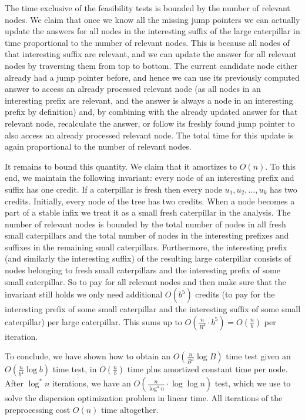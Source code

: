 \documentclass[a4paper,UKenglish]{lipics-v2016}
\theoremstyle{plain}
\begin{document}
The time exclusive of the feasibility tests is bounded by the number of relevant nodes.
We claim that once we know all the missing jump pointers we can actually update the answers
for all nodes in the interesting suffix of the large caterpillar in time proportional to the
number of relevant nodes. This is because all nodes of that interesting suffix are
relevant, and we can update the answer for all relevant nodes by traversing them from top
to bottom. The current candidate node either already had a jump pointer before, and hence
we can use its previously computed answer to access an already processed relevant node
(as all nodes in an interesting prefix are relevant, and the answer is always a node in an
interesting prefix by definition) and, by combining with the already updated answer for that
relevant node, recalculate the answer, or follow its freshly found jump pointer to also access
an already processed relevant node. The total time for this update is again proportional to the
number of relevant nodes. 

It remains to bound this quantity. We claim that it
amortizes to $O(n)$. To this end, we maintain the following invariant: every node
of an interesting prefix and suffix has one credit. If a caterpillar is fresh
then every node $u_{1},u_{2},\ldots,u_{k}$ has two credits. Initially, every node of the tree
has two credits. When a node becomes a part of a stable infix we treat it as a small fresh
caterpillar in the analysis. The number of relevant nodes is bounded by the total number
of nodes in all fresh small caterpillars and the total number of nodes in the interesting
prefixes and suffixes in the remaining small caterpillars. Furthermore,
the interesting prefix (and similarly the interesting suffix) of the resulting large caterpillar
consists of nodes belonging to fresh small caterpillars and the interesting prefix of
some small caterpillar. So to pay for all relevant nodes and then make sure that the invariant
still holds we only need additional $O(b^{5})$ credits (to pay for the interesting prefix
of some small caterpillar and the interesting suffix of some small caterpillar) per large
caterpillar. This sums up to $O(\frac{n}{B^{4}}\cdot b^{5}) = O(\frac{n}{b})$ per iteration.

To conclude, we have shown how to obtain an $O(\frac{n}{B^{4}}\log B)$ time test given an $O(\frac{n}{b^{4}}\log b)$
time test, in $O(\frac{n}{b})$ time plus amortized constant time per
node. After $\log ^*n$ iterations, we have an  $O(\frac{n}{\log ^4n} \cdot \log \log n)$ test,
which we use to solve the dispersion optimization problem in linear time. All iterations of the preprocessing
cost $O(n)$ time altogether.
\end{document}

